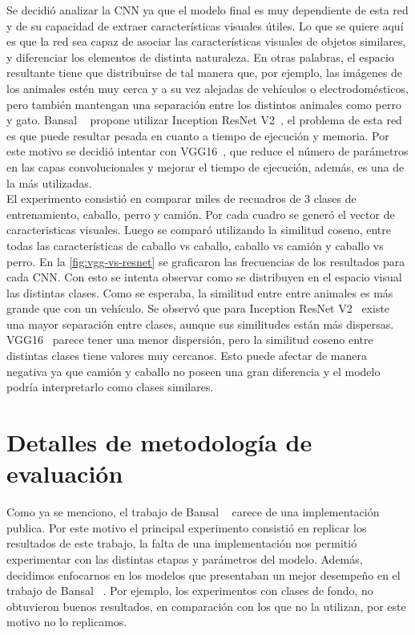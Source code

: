 Se decidió analizar la CNN ya que el modelo final es muy dependiente de esta red y de su capacidad de extraer características visuales útiles. Lo que se quiere aquí es que la red sea capaz de asociar las características visuales de objetos similares, y diferenciar los elementos de distinta naturaleza. En otras palabras, el espacio resultante tiene que distribuirse de tal manera que, por ejemplo, las imágenes de los animales estén muy cerca y a su vez alejadas de vehículos o electrodomésticos, pero también mantengan una separación entre los distintos animales como perro y gato. Bansal \etal~\cite{bansal2018zero} propone utilizar Inception ResNet V2~\cite{resnet}, el problema de esta red es que puede resultar pesada en cuanto a tiempo de ejecución y memoria. Por este motivo se decidió intentar con VGG16~\cite{simonyan2014very}, que reduce el número de parámetros en las capas convolucionales y mejorar el tiempo de ejecución, además, es una de la más utilizadas.\\

El experimento consistió en comparar miles de recuadros de 3 clases de entrenamiento, caballo, perro y camión.  Por cada cuadro se generó el vector de caracteristicas visuales. Luego se comparó utilizando la similitud coseno, entre todas las características de caballo vs caballo, caballo vs camión y caballo vs perro. En la \autoref{fig:vgg-vs-resnet} se graficaron las frecuencias de los resultados para cada CNN. Con esto se intenta observar como se distribuyen en el espacio visual las distintas clases. Como se esperaba, la similitud entre entre animales es más grande que con un vehículo. Se observó que para Inception ResNet V2~\cite{resnet} existe una mayor separación entre clases, aunque sus similitudes están más dispersas. VGG16~\cite{simonyan2014very} parece tener una menor dispersión, pero la similitud coseno entre distintas clases tiene valores muy cercanos. Esto puede afectar de manera negativa ya que camión y caballo no poseen una gran diferencia y el modelo podría interpretarlo como clases similares.\\


\section{Detalles de metodología de evaluación} \label{sec:detallesdemetodologiadeevaluacion}
Como ya se menciono, el trabajo de Bansal \etal~\cite{bansal2018zero} carece de una implementación publica. Por este motivo el principal experimento consistió en replicar los resultados de este trabajo, la falta de una implementación nos permitió experimentar con las distintas etapas y parámetros del modelo. Además, decidimos enfocarnos en los modelos que presentaban un mejor desempeño en el trabajo de Bansal \etal~\cite{bansal2018zero}. Por ejemplo, los experimentos con clases de fondo, no obtuvieron buenos resultados, en comparación con los que no la utilizan, por este motivo no lo replicamos.\\

